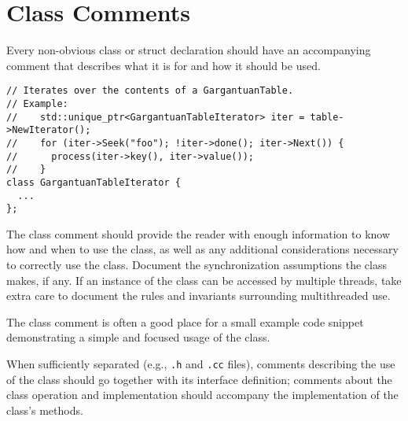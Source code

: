 
\section{Class Comments}\label{sec:class-comments}
Every non-obvious class or struct declaration should have an accompanying comment that describes what it is for and how it should be used.
\begin{verbatim}
// Iterates over the contents of a GargantuanTable.
// Example:
//    std::unique_ptr<GargantuanTableIterator> iter = table->NewIterator();
//    for (iter->Seek("foo"); !iter->done(); iter->Next()) {
//      process(iter->key(), iter->value());
//    }
class GargantuanTableIterator {
  ...
};
\end{verbatim}
The class comment should provide the reader with enough information to know how and when to use the class, as well as any additional considerations necessary to correctly use the class. Document the synchronization assumptions the class makes, if any. If an instance of the class can be accessed by multiple threads, take extra care to document the rules and invariants surrounding multithreaded use.

The class comment is often a good place for a small example code snippet demonstrating a simple and focused usage of the class.

When sufficiently separated (e.g., \texttt{.h} and \texttt{.cc} files), comments describing the use of the class should go together with its interface definition; comments about the class operation and implementation should accompany the implementation of the class's methods.
